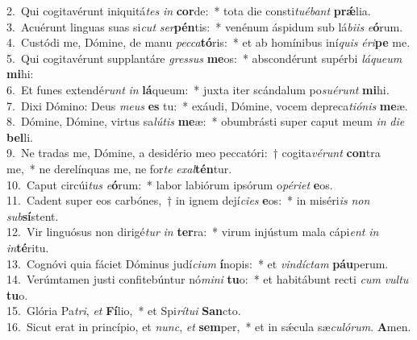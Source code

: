 {2.~}Qui cogitavérunt iniquitá\textit{tes} \textit{in} \textbf{cor}de:~* tota die consti\textit{tu}\textit{é}\textit{bant} \textbf{prǽ}lia.\\
{3.~}Acuérunt linguas suas si\textit{cut} \textit{ser}\textbf{pén}tis:~* venénum áspidum sub lá\textit{bi}\textit{is} \textit{e}\textbf{ó}rum.\\
{4.~}Custódi me, Dómine, de manu \textit{pec}\textit{ca}\textbf{tó}ris:~* et ab homínibus iní\textit{quis} \textit{é}\textit{ri}\textbf{pe} me.\\
{5.~}Qui cogitavérunt supplantáre \textit{gres}\textit{sus} \textbf{me}os:~* abscondérunt supérbi \textit{lá}\textit{que}\textit{um} \textbf{mi}hi:\\
{6.~}Et funes extendé\textit{runt} \textit{in} \textbf{lá}queum:~* juxta iter scándalum po\textit{su}\textit{é}\textit{runt} \textbf{mi}hi.\\
{7.~}Dixi Dómino: Deus \textit{me}\textit{us} \textbf{es} tu:~* exáudi, Dómine, vocem depreca\textit{ti}\textit{ó}\textit{nis} \textbf{me}æ.\\
{8.~}Dómine, Dómine, virtus sa\textit{lú}\textit{tis} \textbf{me}æ:~* obumbrásti super caput meum \textit{in} \textit{di}\textit{e} \textbf{bel}li.\\
{9.~}Ne tradas me, Dómine, a desidério meo peccatóri:~† cogita\textit{vé}\textit{runt} \textbf{con}tra me,~* ne derelínquas me, ne for\textit{te} \textit{e}\textit{xal}\textbf{tén}tur.\\
{10.~}Caput circúi\textit{tus} \textit{e}\textbf{ó}rum:~* labor labiórum ipsórum o\textit{pé}\textit{ri}\textit{et} \textbf{e}os.\\
{11.~}Cadent super eos carbónes,~† in ignem dejí\textit{ci}\textit{es} \textbf{e}os:~* in miséri\textit{is} \textit{non} \textit{sub}\textbf{sí}stent.\\
{12.~}Vir linguósus non dirigé\textit{tur} \textit{in} \textbf{ter}ra:~* virum injústum mala cápi\textit{ent} \textit{in} \textit{in}\textbf{té}ritu.\\
{13.~}Cognóvi quia fáciet Dóminus judí\textit{ci}\textit{um} \textbf{í}nopis:~* et \textit{vin}\textit{dí}\textit{ctam} \textbf{páu}perum.\\
{14.~}Verúmtamen justi confitebúntur nó\textit{mi}\textit{ni} \textbf{tu}o:~* et habitábunt recti \textit{cum} \textit{vul}\textit{tu} \textbf{tu}o.\\
{15.~}Glória Pa\textit{tri}, \textit{et} \textbf{Fí}lio,~* et Spi\textit{rí}\textit{tu}\textit{i} \textbf{San}cto.\\
{16.~}Sicut erat in princípio, et \textit{nunc}, \textit{et} \textbf{sem}per,~* et in sǽcula sæ\textit{cu}\textit{ló}\textit{rum}. \textbf{A}men.\\
